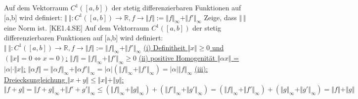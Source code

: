 \documentclass[a6paper
	,10pt
	,grid=none
]{kartei}
\begin{document}
\begin{karte}
	[Norm]
	{
		Auf dem Vektorraum $C^1([a,b])$ der stetig differenzierbaren Funktionen auf [a,b] wird definiert:
		$ \Vert \ \Vert : C^1 ([a,b]) \rightarrow \mathbb{R}, f \rightarrow \Vert f \Vert := \Vert f \Vert_\infty + \Vert f' \Vert_\infty$ \newline\newline
		Zeige, dass $\Vert \ \Vert$ eine Norm ist.
	}
	[KE1.4.SE]
	{
		Auf dem Vektorraum $C^1([a,b])$ der stetig differenzierbaren Funktionen auf [a,b] wird definiert:
		$ \Vert \ \Vert : C^1 ([a,b]) \rightarrow \mathbb{R}, f \rightarrow \Vert f \Vert := \Vert f \Vert_\infty + \Vert f' \Vert_\infty$ \newline\newline
		\underline{(i) Definitheit $\Vert x \Vert \geq 0$ und $(\Vert x \Vert = 0 \Leftrightarrow x=0)$:}
		\newline
		$\Vert f \Vert = \Vert f \Vert_\infty + \Vert f' \Vert_\infty \geq 0$
		\newline\newline\newline
		\underline{(ii) positive Homogenität $\Vert \alpha x \Vert$ = $\vert \alpha \vert \cdot \Vert x \Vert$:}
		\newline
		$\Vert \alpha f \Vert
		= \Vert \alpha f \Vert_\infty + \Vert \alpha f' \Vert_\infty 
		= \vert \alpha \vert (\Vert f \Vert_\infty + \Vert f' \Vert_\infty)
		= \vert \alpha \vert \Vert  f \Vert_\infty
		$
		\newline\newline\newline
		\underline{(iii): Dreiecksungleichung $\Vert x +y \Vert \leq \Vert x \Vert + \Vert y \Vert$:}
		\newline
		$\Vert f+g \Vert
		= \Vert f+g \Vert_\infty + \Vert f'+g' \Vert_\infty 
		\leq (\Vert f \Vert_\infty + \Vert g \Vert_\infty) + (\Vert f' \Vert_\infty + \Vert g' \Vert_\infty)
		= (\Vert f \Vert_\infty + \Vert f' \Vert_\infty) + (\Vert g \Vert_\infty + \Vert g' \Vert_\infty)
		=\Vert f \Vert + \Vert g \Vert
		$
	}
\end{karte}
\end{document}
